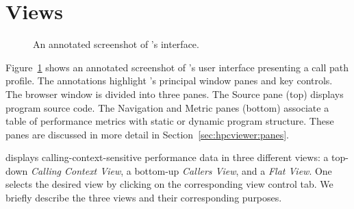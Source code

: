 
\section{Views}

\begin{figure}[t]
\caption{An annotated screenshot of \hpcviewer{}'s interface.}
\label{fig:hpcviewer-legend}
\end{figure}

Figure~\ref{fig:hpcviewer-legend} shows an annotated screenshot of \hpcviewer{}'s user interface presenting a call path profile.
The annotations highlight \hpcviewer{}'s principal window panes and key controls.
The browser window is divided into three panes.
The Source pane (top) displays program source code.
The Navigation and Metric panes (bottom) associate a table of performance metrics with static or dynamic program structure.
These panes are discussed in more detail in Section~\ref{sec:hpcviewer:panes}.

\hpcviewer{} displays calling-context-sensitive performance data in three different views: a top-down \emph{Calling Context View}, a bottom-up \emph{Callers View}, and a \emph{Flat View}.
One selects the desired view by clicking on the corresponding view control tab.
We briefly describe the three views and their corresponding purposes.


